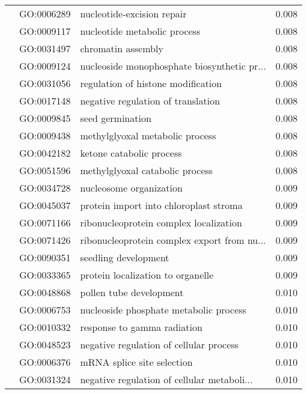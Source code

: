 \begin{longtable}{lllr}
   & GO:0006289 &                   nucleotide-excision repair &         0.008 \\
   & GO:0009117 &                 nucleotide metabolic process &         0.008 \\
   & GO:0031497 &                           chromatin assembly &         0.008 \\
   & GO:0009124 &  nucleoside monophosphate biosynthetic pr... &         0.008 \\
   & GO:0031056 &           regulation of histone modification &         0.008 \\
   & GO:0017148 &           negative regulation of translation &         0.008 \\
   & GO:0009845 &                             seed germination &         0.008 \\
   & GO:0009438 &              methylglyoxal metabolic process &         0.008 \\
   & GO:0042182 &                     ketone catabolic process &         0.008 \\
   & GO:0051596 &              methylglyoxal catabolic process &         0.008 \\
   & GO:0034728 &                      nucleosome organization &         0.009 \\
   & GO:0045037 &       protein import into chloroplast stroma &         0.009 \\
   & GO:0071166 &       ribonucleoprotein complex localization &         0.009 \\
   & GO:0071426 &  ribonucleoprotein complex export from nu... &         0.009 \\
   & GO:0090351 &                         seedling development &         0.009 \\
   & GO:0033365 &            protein localization to organelle &         0.009 \\
   & GO:0048868 &                      pollen tube development &         0.010 \\
   & GO:0006753 &       nucleoside phosphate metabolic process &         0.010 \\
   & GO:0010332 &                  response to gamma radiation &         0.010 \\
   & GO:0048523 &      negative regulation of cellular process &         0.010 \\
   & GO:0006376 &                   mRNA splice site selection &         0.010 \\
   & GO:0031324 &  negative regulation of cellular metaboli... &         0.010 \\

\end{longtable}

